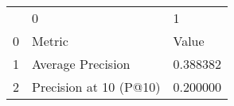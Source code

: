 \begin{tabular}{lll}
 & 0 & 1 \\
0 & Metric & Value \\
1 & Average Precision & 0.388382 \\
2 & Precision at 10 (P@10) & 0.200000 \\
\end{tabular}
